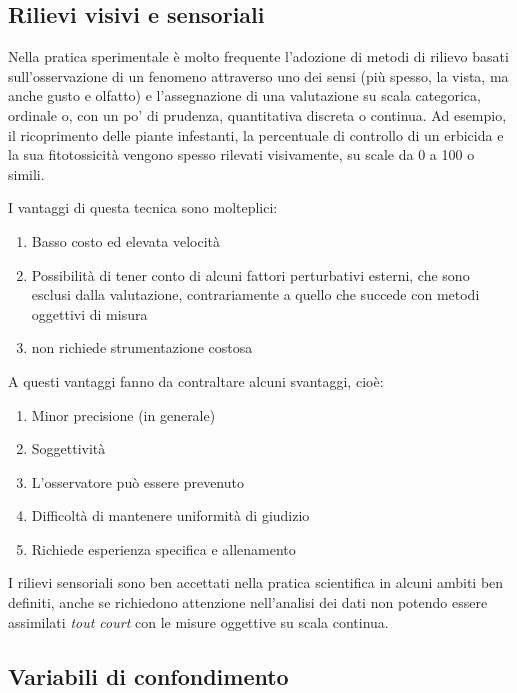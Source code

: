 \documentclass[a4paper,12pt,oneside]{book}
\providecommand{\tightlist}{%
  \setlength{\itemsep}{0pt}\setlength{\parskip}{0pt}}
\begin{document}
\hypertarget{rilievi-visivi-e-sensoriali}{%
\subsection{Rilievi visivi e sensoriali}\label{rilievi-visivi-e-sensoriali}}

Nella pratica sperimentale è molto frequente l'adozione di metodi di rilievo basati sull'osservazione di un fenomeno attraverso uno dei sensi (più spesso, la vista, ma anche gusto e olfatto) e l'assegnazione di una valutazione su scala categorica, ordinale o, con un po' di prudenza, quantitativa discreta o continua. Ad esempio, il ricoprimento delle piante infestanti, la percentuale di controllo di un erbicida e la sua fitotossicità vengono spesso rilevati visivamente, su scale da 0 a 100 o simili.

I vantaggi di questa tecnica sono molteplici:

\begin{enumerate}
\def\labelenumi{\arabic{enumi}.}
\tightlist
\item
  Basso costo ed elevata velocità
\item
  Possibilità di tener conto di alcuni fattori perturbativi esterni, che sono esclusi dalla valutazione, contrariamente a quello che succede con metodi oggettivi di misura
\item
  non richiede strumentazione costosa
\end{enumerate}

A questi vantaggi fanno da contraltare alcuni svantaggi, cioè:

\begin{enumerate}
\def\labelenumi{\arabic{enumi}.}
\tightlist
\item
  Minor precisione (in generale)
\item
  Soggettività
\item
  L'osservatore può essere prevenuto
\item
  Difficoltà di mantenere uniformità di giudizio
\item
  Richiede esperienza specifica e allenamento
\end{enumerate}

I rilievi sensoriali sono ben accettati nella pratica scientifica in alcuni ambiti ben definiti, anche se richiedono attenzione nell'analisi dei dati non potendo essere assimilati \emph{tout court} con le misure oggettive su scala continua.

\hypertarget{variabili-di-confondimento}{%
\subsection{Variabili di confondimento}\label{variabili-di-confondimento}}
\end{document}
